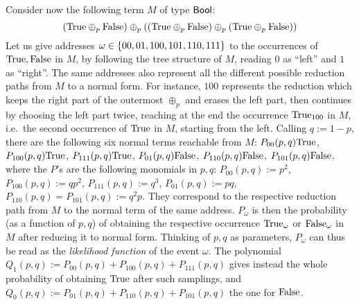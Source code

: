 Consider now the following term $M$ of type $\mathsf{Bool}$:
\[
 (\mathrm{True} \oplus_p\mathrm{False})\oplus_p((\mathrm{True}\oplus_p\mathrm{False})\oplus_p(\mathrm{True}\oplus_p\mathrm{False}))
\]
Let us give addresses $\omega\in\{00,01,100,101,110,111\}$ to the occurrences of $\mathrm{True},\mathrm{False}$ in $M$, by following the tree structure of $M$, reading $0$ as ``left'' and $1$ as ``right''.
The same addresses also represent all the different possible reduction paths from $M$ to a normal form.
For instance, $100$ represents the reduction which keeps the right part of the outermost $\oplus_p$ and erases the left part, then continues by choosing the left part twice, reaching at the end the occurrence $\mathrm{True}_{100}$ in $M$, i.e.\ the second occurrence of $\mathrm{True}$ in $M$, starting from the left.
Calling $q:=1-p$, there are the following six normal terms reachable from $M$:
$P_{00}(p,q)\mathrm{True}$, 
$P_{100}(p,q)\mathrm{True}$, 
$P_{111}(p,q)\mathrm{True}$, 
$P_{01}(p,q)\mathrm{False}$, 
$P_{110}(p,q)\mathrm{False}$,
$P_{101}(p,q)\mathrm{False}$,
where the $P$'s are the following monomials in $p,q$:
$P_{00}(p,q):=p^2$,
$P_{100}(p,q):=qp^2$,
$P_{111}(p,q):=q^3$,
$P_{01}(p,q):=pq$,
$P_{110}(p,q)=P_{101}(p,q):=q^2p$.
They correspond to the respective reduction path from $M$ to the normal term of the same address.
$P_{\omega}$ is then the probability (as a function of $p,q$) of obtaining the respective occurrence $\mathrm{True}_{\omega}$ or $\mathrm{False}_\omega$ in $M$ after reducing it to normal form.
Thinking of $p,q$ as parameters, $P_{\omega}$ can thus be read as the \emph{likelihood function} of the event $\omega$.
The polynomial $Q_{1}(p,q):=P_{00}(p,q)+P_{100}(p,q)+P_{111}(p,q)$ gives instead the whole probability of obtaining $\mathrm{True}$ after such samplings, and $Q_{0}(p,q):=P_{01}(p,q)+P_{110}(p,q)+P_{101}(p,q)$ the one for $\mathrm{False}$.


